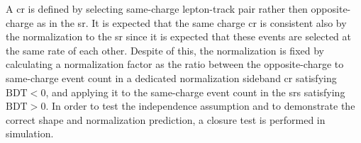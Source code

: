 A \gls{cr} is defined by selecting same-charge lepton-track pair rather then opposite-charge as in the \gls{sr}. It is expected that the same charge \gls{cr} is consistent also by the normalization to the \gls{sr} since it is expected that these events are selected at the same rate of each other. Despite of this, the normalization is fixed by calculating a normalization factor as the ratio between the opposite-charge to same-charge event count in a dedicated normalization sideband \gls{cr} satisfying $\text{BDT} < 0$, and applying it to the same-charge event count in the \glspl{sr} satisfying $\text{BDT} > 0$. In order to test the independence assumption and to demonstrate the correct shape and normalization prediction, a closure test is performed in simulation.